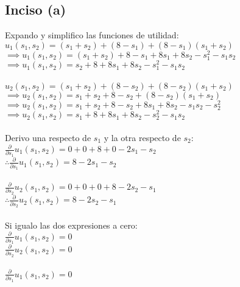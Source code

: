 \documentclass{article}
\begin{document}
        \subsection*{Inciso (a)}
            Expando y simplifico las funciones de utilidad: \\
            \(u_{1}(s_{1}, s_{2}) = (s_{1}+s_{2})+(8-s_{1})+(8-s_{1})(s_{1}+s_{2})\) \\
            \(\implies u_{1}(s_{1}, s_{2}) = (s_{1}+s_{2})+8-s_{1}+8s_{1}+8s_{2}-s_{1}^{2}-s_{1}s_{2}\) \\
            \(\implies u_{1}(s_{1}, s_{2}) = s_{2}+8+8s_{1}+8s_{2}-s_{1}^{2}-s_{1}s_{2}\) \\
            \\
            \(u_{2}(s_{1}, s_{2}) = (s_{1}+s_{2})+(8-s_{2})+(8-s_{2})(s_{1}+s_{2})\) \\
            \(\implies u_{2}(s_{1}, s_{2}) = s_{1}+s_{2}+8-s_{2}+(8-s_{2})(s_{1}+s_{2})\) \\
            \(\implies u_{2}(s_{1}, s_{2}) = s_{1}+s_{2}+8-s_{2}+8s_{1}+8s_{2}-s_{1}s_{2}-s_{2}^{2}\) \\
            \(\implies u_{2}(s_{1}, s_{2}) = s_{1}+8+8s_{1}+8s_{2}-s_{2}^{2}-s_{1}s_{2}\) \\
            \\
            Derivo una respecto de \(s_{1}\) y la otra respecto de \(s_{2}\): \\
            \(\frac{\partial}{\partial s_{1}}u_{1}(s_{1}, s_{2}) = 0 + 0 + 8 + 0 -2s_{1} - s_{2}\) \\
            \(\therefore \frac{\partial}{\partial s_{1}}u_{1}(s_{1}, s_{2}) = 8 -2s_{1} - s_{2}\) \\
            \\
            \(\frac{\partial}{\partial s_{2}}u_{2}(s_{1}, s_{2}) = 0 + 0 + 0 + 8 - 2s_{2} - s_{1}\) \\
            \(\therefore \frac{\partial}{\partial s_{2}}u_{2}(s_{1}, s_{2}) = 8 - 2s_{2} - s_{1}\) \\
            \\
            Si igualo las dos expresiones a cero: \\
            \(\frac{\partial}{\partial s_{1}}u_{1}(s_{1}, s_{2}) = 0\) \\
            \(\frac{\partial}{\partial s_{2}}u_{2}(s_{1}, s_{2}) = 0\) \\
            \\
            \(\frac{\partial}{\partial s_{1}}u_{1}(s_{1}, s_{2}) = 0\) \\
\end{document}
